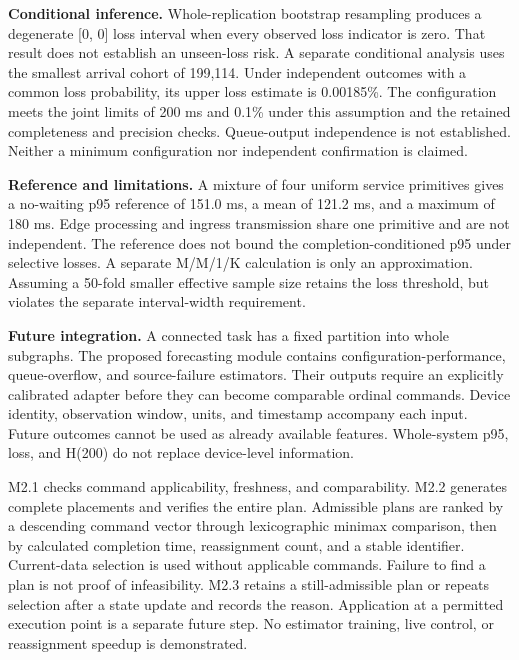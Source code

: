 \documentclass{psta}
\begin{document}
\textbf{Conditional inference.} Whole-replication bootstrap resampling produces a degenerate {[}0, 0{]} loss interval when every observed loss indicator is zero. That result does not establish an unseen-loss risk. A separate conditional analysis uses the smallest arrival cohort of 199,114. Under independent outcomes with a common loss probability, its upper loss estimate is 0.00185\%. The configuration meets the joint limits of 200 ms and 0.1\% under this assumption and the retained completeness and precision checks. Queue-output independence is not established. Neither a minimum configuration nor independent confirmation is claimed.

\textbf{Reference and limitations.} A mixture of four uniform service primitives gives a no-waiting p95 reference of 151.0 ms, a mean of 121.2 ms, and a maximum of 180 ms. Edge processing and ingress transmission share one primitive and are not independent. The reference does not bound the completion-conditioned p95 under selective losses. A separate M/M/1/K calculation is only an approximation. Assuming a 50-fold smaller effective sample size retains the loss threshold, but violates the separate interval-width requirement.

\textbf{Future integration.} A connected task has a fixed partition into whole subgraphs. The proposed forecasting module contains configuration-performance, queue-overflow, and source-failure estimators. Their outputs require an explicitly calibrated adapter before they can become comparable ordinal commands. Device identity, observation window, units, and timestamp accompany each input. Future outcomes cannot be used as already available features. Whole-system p95, loss, and H(200) do not replace device-level information.

M2.1 checks command applicability, freshness, and comparability. M2.2 generates complete placements and verifies the entire plan. Admissible plans are ranked by a descending command vector through lexicographic minimax comparison, then by calculated completion time, reassignment count, and a stable identifier. Current-data selection is used without applicable commands. Failure to find a plan is not proof of infeasibility. M2.3 retains a still-admissible plan or repeats selection after a state update and records the reason. Application at a permitted execution point is a separate future step. No estimator training, live control, or reassignment speedup is demonstrated.

\clearpage\English\makeauthorsinfo
\end{document}
